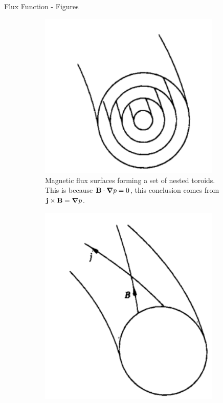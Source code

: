 \begin{frame} {Flux Function - Figures}
  \begin{figure}
    \centering
    \begin{subfigure}{0.45\textwidth}
      \includegraphics[width=0.95\textwidth]{figures/magnetic-flux-surfaces.png}
      \caption{Magnetic flux surfaces forming a set of nested toroids. This is because $\mathbf{B}\cdot\grad p=0$, this conclusion comes from $\mathbf{j\times B}=\grad p$.}
    \end{subfigure}%
    \begin{subfigure}{0.45\textwidth}
      \includegraphics[width=0.95\textwidth]{figures/field-line-and-current-line.png}

\end{subfigure}
\end{figure}
\end{frame}

